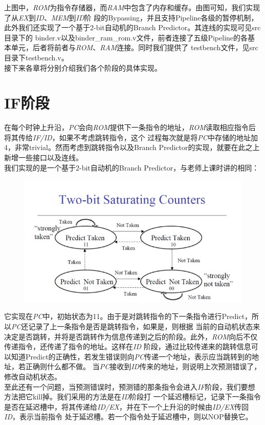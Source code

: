 \documentclass[titlepage]{article}
\begin{document}
上图中，\emph{ROM}为指令存储器，而\emph{RAM}中包含了内存和缓存。由图可知，我们实现了从\emph{EX}到\emph{ID}、\emph{MEM}到\emph{ID}阶
段的Bypassing，并且支持Pipeline各级的暂停机制，此外我们还实现了一个基于2-bit自动机的Branch Predictor。其连线的实现可见src目录下的
binder.v以及binder\_ram\_rom.v文件，前者连接了五级Pipeline的各基本单元，后者将前者与\emph{ROM}、\emph{RAM}连接。同时我们提供了
testbench文件，见src目录下testbench.v。\\
\indent 接下来各章将分别介绍我们各个阶段的具体实现。
\section{IF阶段}
在每个时钟上升沿，\emph{PC}会向\emph{ROM}提供下一条指令的地址，\emph{ROM}读取相应指令后将其传给\emph{IF/ID}，如果不考虑跳转指令，这个
过程每次就是将\emph{PC}中存储的地址加4，非常trivial。然而考虑到跳转指令以及Branch Predictor的实现，就要在此之上新增一些接口以及连线。\\
\indent 我们实现的是一个基于2-bit自动机的Branch Predictor，与老师上课时讲的相同：
\begin{figure}[H]
\includegraphics{bp.JPG}
\end{figure}
它实现在\emph{PC}中，初始状态为11。由于是对跳转指令的下一条指令进行Predict，所以\emph{PC}还记录了上一条指令是否是跳转指令，如果是，则根据
当前的自动机状态来决定是否跳转，并将是否跳转作为信息传递到之后的阶段。此外，\emph{ROM}向后不仅传递指令，还传递了指令的地址。这样在\emph{ID}
阶段，通过比较传递来的跳转信息可以知道Predict的正确性，若发生错误则向\emph{PC}传递一个地址，表示应当跳转到的地址，若正确则什么都不做。
当\emph{PC}接收到\emph{ID}传来的地址，则说明上次预测错误了，修改自动机状态。\\
\indent 至此还有一个问题，当预测错误时，预测错的那条指令会进入\emph{IF}阶段，我们要想方法把它kill掉。我们采用的方法是在\emph{ID}阶段打
一个延迟槽标记，记录下一条指令是否在延迟槽中，将其传递给\emph{ID/EX}，并在下一个上升沿的时候由\emph{ID/EX}传回\emph{ID}，表示当前指令
处于延迟槽。若一个指令处于延迟槽中，则以NOP替换它。
\end{document}
